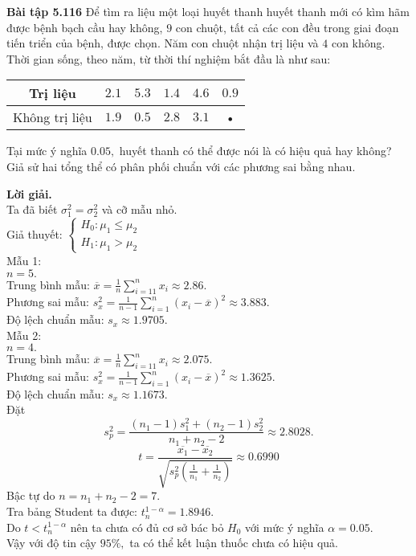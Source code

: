 \begin{mybox}
\textbf{Bài tập 5.116} Để tìm ra liệu một loại huyết thanh huyết thanh mới có kìm hãm được bệnh bạch cầu hay không, $9$ con chuột, tất cả các con đều trong giai đoạn tiến triển của bệnh, được chọn. Năm con chuột nhận trị liệu và $4$ con không. Thời gian sống, theo năm, từ thời thí nghiệm bắt đầu là như sau:
\begin{table}[H]
\begin{tabular}{|c|c|c|c|c|c|}
\hline 
Trị liệu & $2.1$ & $5.3$ & $1.4$ & $4.6$ & $0.9$ \\ 
\hline 
Không trị liệu & $1.9$ & $0.5$ & $2.8$ & $3.1$ & • \\ 
\hline 
\end{tabular} 
\end{table}
Tại mức ý nghĩa $0.05,$ huyết thanh có thể được nói là có hiệu quả hay không? Giả sử hai tổng thể có phân phối chuẩn với các phương sai bằng nhau.
\end{mybox}
\textbf{Lời giải.}\\
Ta đã biết $\sigma_1^2 = \sigma_2^2 $ và cỡ mẫu nhỏ.\\
Giả thuyết: $\begin{cases}
H_0: \mu_1 \leqslant \mu_2\\
H_1: \mu_1 > \mu_2
\end{cases}$\\
Mẫu 1: \\
$n = 5.$\\
Trung bình mẫu:
$\overline x  = \frac{1}{n}\sum\limits_{i =1 1}^n {{x_i}}  \approx 2.86.$\\
Phương sai mẫu: $s_x^2 = \frac{1}{{n - 1}}\sum\limits_{i = 1}^n {{{\left( {{x_i} - \overline x } \right)}^2}}  \approx 3.883.$\\
Độ lệch chuẩn mẫu: ${s_x} \approx 1.9705.$\\
Mẫu 2: \\
$n = 4.$\\
Trung bình mẫu:
$\overline x  = \frac{1}{n}\sum\limits_{i =1 1}^n {{x_i}}  \approx 2.075.$\\
Phương sai mẫu: $s_x^2 = \frac{1}{{n - 1}}\sum\limits_{i = 1}^n {{{\left( {{x_i} - \overline x } \right)}^2}}  \approx 1.3625.$\\
Độ lệch chuẩn mẫu: ${s_x} \approx 1.1673.$\\
Đặt $$s_p^2 = \frac{{\left( {{n_1} - 1} \right)s_1^2 + \left( {{n_2} - 1} \right)s_2^2}}{{{n_1} + {n_2} - 2}} \approx 2.8028.$$
$$t = \frac{{\overline {{x_1}}  - \overline {{x_2}} }}{{\sqrt {s_p^2\left( {\frac{1}{{{n_1}}} + \frac{1}{{{n_2}}}} \right)} }} \approx 0.6990$$
Bậc tự do $n = n_1 + n_2 - 2 = 7.$\\
Tra bảng Student ta được: $t_{n}^{1 - \alpha} = 1.8946.$\\
Do $t < t_{n}^{1 - \alpha}$ nên ta chưa có đủ cơ sở bác bỏ $H_0$ với mức ý nghĩa $\alpha = 0.05.$\\
Vậy với độ tin cậy $95\%,$ ta có thể kết luận thuốc chưa có hiệu quả.